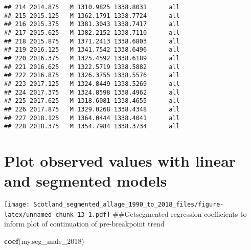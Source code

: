 \documentclass[]{article}
\newenvironment{Shaded}{\begin{snugshade}}{\end{snugshade}}
\newcommand{\KeywordTok}[1]{\textcolor[rgb]{0.13,0.29,0.53}{\textbf{#1}}}
\newcommand{\DataTypeTok}[1]{\textcolor[rgb]{0.13,0.29,0.53}{#1}}
\newcommand{\DecValTok}[1]{\textcolor[rgb]{0.00,0.00,0.81}{#1}}
\newcommand{\StringTok}[1]{\textcolor[rgb]{0.31,0.60,0.02}{#1}}
\newcommand{\OperatorTok}[1]{\textcolor[rgb]{0.81,0.36,0.00}{\textbf{#1}}}
\newcommand{\NormalTok}[1]{#1}
\begin{document}
\begin{verbatim}
## 214 2014.875   M 1310.9825 1338.8031      all
## 215 2015.125   M 1362.1791 1338.7724      all
## 216 2015.375   M 1381.3043 1338.7417      all
## 217 2015.625   M 1382.2152 1338.7110      all
## 218 2015.875   M 1371.2413 1338.6803      all
## 219 2016.125   M 1341.7542 1338.6496      all
## 220 2016.375   M 1325.4592 1338.6189      all
## 221 2016.625   M 1322.5719 1338.5882      all
## 222 2016.875   M 1326.3755 1338.5576      all
## 223 2017.125   M 1324.8449 1338.5269      all
## 224 2017.375   M 1324.8598 1338.4962      all
## 225 2017.625   M 1318.6081 1338.4655      all
## 226 2017.875   M 1329.0268 1338.4348      all
## 227 2018.125   M 1364.0444 1338.4041      all
## 228 2018.375   M 1354.7984 1338.3734      all
\end{verbatim}

\section{Plot observed values with linear and segmented
models}\label{plot-observed-values-with-linear-and-segmented-models}

\begin{Shaded}
\end{Shaded}

\texttt{[image: Scotland\_segmented\_allage\_1990\_to\_2018\_files/figure-latex/unnamed-chunk-13-1.pdf]}
\#\#Getsegmented regression coefficients to inform plot of continuation
of pre-breakpoint trend

\begin{Shaded}
\begin{Highlighting}[]
\KeywordTok{coef}\NormalTok{(my.seg_male_}\DecValTok{2018}\NormalTok{)}
\end{Highlighting}
\end{Shaded}
\end{document}
